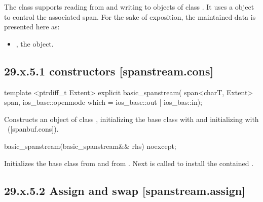 \documentclass[ebook,11pt,article]{memoir}
\renewcommand{\iref}[1]{[#1]}
\begin{document}
\pnum
The class
supports reading from and writing to objects of class
.
It uses a
object to control the associated span.
For the sake of exposition, the maintained data is presented here as:
\begin{itemize}
\item
{}, the  object.
\end{itemize}

\subsection{29.x.5.1  constructors [spanstream.cons]}
\label{spanstream.cons}

\begin{itemdecl}
template <ptrdiff_t Extent>
explicit basic_spanstream(
  span<charT, Extent> span,
  ios_base::openmode which = ios_base::out | ios_bas::in);
\end{itemdecl}

\begin{itemdescr}
\pnum
\effects
Constructs an object of class
,
initializing the base class with
and initializing  with
~(\iref{spanbuf.cons}).
\end{itemdescr}

\begin{itemdecl}
basic_spanstream(basic_spanstream&& rhs) noexcept;
\end{itemdecl}

\begin{itemdescr}
\pnum
\effects Initializes the base class from  
and  from .
Next  is called to
install the contained .
\end{itemdescr}

\subsection{29.x.5.2 Assign and swap [spanstream.assign]}
\label{spanstream.assign}
\end{document}
